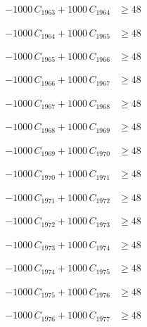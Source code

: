 \documentclass[a4paper,11pt]{article}
\begin{document}
\begin{align}
-1000\,C_{1963} + 1000\,C_{1964} &\geq 48 \nonumber
\end{align}

\begin{align}
-1000\,C_{1964} + 1000\,C_{1965} &\geq 48 \nonumber
\end{align}

\begin{align}
-1000\,C_{1965} + 1000\,C_{1966} &\geq 48 \nonumber
\end{align}

\begin{align}
-1000\,C_{1966} + 1000\,C_{1967} &\geq 48 \nonumber
\end{align}

\begin{align}
-1000\,C_{1967} + 1000\,C_{1968} &\geq 48 \nonumber
\end{align}

\begin{align}
-1000\,C_{1968} + 1000\,C_{1969} &\geq 48 \nonumber
\end{align}

\begin{align}
-1000\,C_{1969} + 1000\,C_{1970} &\geq 48 \nonumber
\end{align}

\begin{align}
-1000\,C_{1970} + 1000\,C_{1971} &\geq 48 \nonumber
\end{align}

\begin{align}
-1000\,C_{1971} + 1000\,C_{1972} &\geq 48 \nonumber
\end{align}

\begin{align}
-1000\,C_{1972} + 1000\,C_{1973} &\geq 48 \nonumber
\end{align}

\begin{align}
-1000\,C_{1973} + 1000\,C_{1974} &\geq 48 \nonumber
\end{align}

\begin{align}
-1000\,C_{1974} + 1000\,C_{1975} &\geq 48 \nonumber
\end{align}

\begin{align}
-1000\,C_{1975} + 1000\,C_{1976} &\geq 48 \nonumber
\end{align}

\begin{align}
-1000\,C_{1976} + 1000\,C_{1977} &\geq 48 \nonumber
\end{align}
\end{document}
